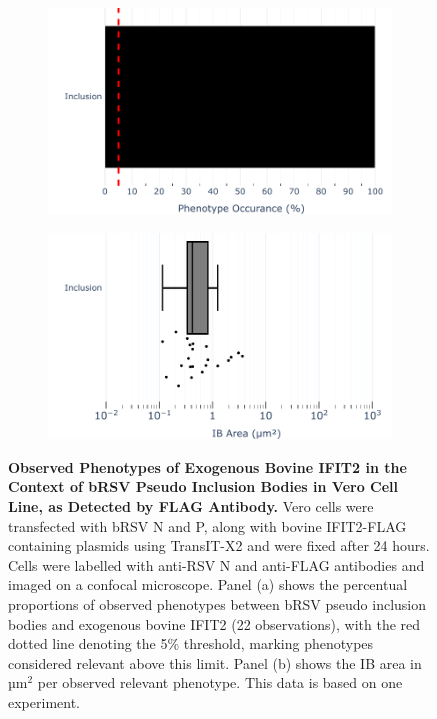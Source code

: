 \begin{figure}
    \begin{subfigure}{0.495\textwidth}
        \caption{}
        \includegraphics[width=1\linewidth]{09. Chapter 4/Figs/01. pIB/03. IFIT2/04. IFIT2-FLAG/03. FLAG/07. bar_bi2f_bnbp.pdf} 
    \end{subfigure}
    \begin{subfigure}{0.495\textwidth}
        \caption{}
        \includegraphics[width=1\linewidth]{09. Chapter 4/Figs/01. pIB/03. IFIT2/04. IFIT2-FLAG/03. FLAG/08. box_bi2f_bnbp.pdf}
    \end{subfigure}
    \caption[Observed Phenotypes of Exogenous Bovine IFIT2 in the Context of bRSV Pseudo Inclusion Bodies in Vero Cell Line, as Detected by FLAG Antibody.]{\textbf{Observed Phenotypes of Exogenous Bovine IFIT2 in the Context of bRSV Pseudo Inclusion Bodies in Vero Cell Line, as Detected by FLAG Antibody.} Vero cells were transfected with bRSV N and P, along with bovine IFIT2-FLAG containing plasmids using TransIT-X2 and were fixed after 24 hours. Cells were labelled with anti-RSV N and anti-FLAG antibodies and imaged on a confocal microscope. Panel (a) shows the percentual proportions of observed phenotypes between bRSV pseudo inclusion bodies and exogenous bovine IFIT2 (22 observations), with the red dotted line denoting the 5\% threshold, marking phenotypes considered relevant above this limit. Panel (b) shows the IB area in \(\mbox{µm}^2\) per observed relevant phenotype. This data is based on one experiment.}
    \label{fig:Observed Phenotypes of Exogenous Bovine IFIT2 in the Context of bRSV Pseudo Inclusion Bodies in Vero Cell Line, as Detected by FLAG Antibody}
\end{figure}

